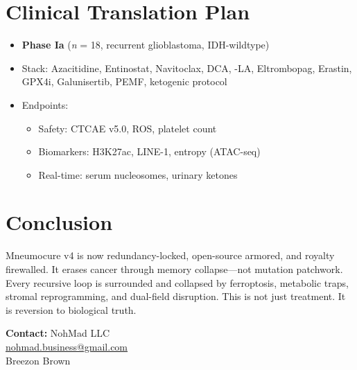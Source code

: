\documentclass[12pt]{article}
\begin{document}
\section{Clinical Translation Plan}
\begin{itemize}
    \item \textbf{Phase Ia} (\textit{n} = 18, recurrent glioblastoma, IDH-wildtype)
    \item Stack: Azacitidine, Entinostat, Navitoclax, DCA, \textalpha-LA, Eltrombopag, Erastin, GPX4i, Galunisertib, PEMF, ketogenic protocol
    \item Endpoints:
    \begin{itemize}
        \item Safety: CTCAE v5.0, ROS, platelet count
        \item Biomarkers: H3K27ac, LINE-1, entropy (ATAC-seq)
        \item Real-time: serum nucleosomes, urinary ketones
    \end{itemize}
\end{itemize}

\section{Conclusion}
Mneumocure\texttrademark{} v4 is now redundancy-locked, open-source armored, and royalty firewalled. It erases cancer through memory collapse---not mutation patchwork. Every recursive loop is surrounded and collapsed by ferroptosis, metabolic traps, stromal reprogramming, and dual-field disruption. This is not just treatment. It is reversion to biological truth.

\vspace{1em}
\textbf{Contact:} NohMad LLC \\ \href{mailto:nohmad.business@gmail.com}{nohmad.business@gmail.com} \\ Breezon Brown
\end{document}
